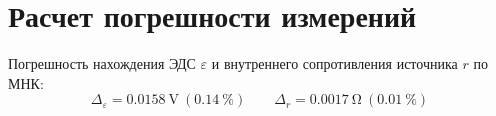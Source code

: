\section{Расчет погрешности измерений}
Погрешность нахождения ЭДС $\varepsilon$ и внутреннего сопротивления источника $r$ по МНК:
\[
  \Delta_\varepsilon = \SI{0.0158}{\volt} \: (\SI{0.14}{\percent})
  \qquad
  \Delta_r = \SI{0.0017}{\ohm} \: (\SI{0.01}{\percent})
\]

